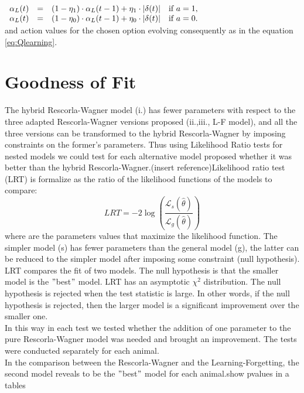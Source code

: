 \begin{description}
   $\begin{array}{lcll}
    \alpha_{L}(t) & = & (1-\eta_1)\cdot\alpha_{L}(t-1)+\eta_1\cdot\left\lvert\delta(t)\right\rvert & \mbox{if\,\,}  a=1,\\
    \alpha_{L}(t) & = & (1-\eta_0)\cdot\alpha_{L}(t-1)+\eta_0\cdot\left\lvert\delta(t)\right\rvert & \mbox{if\,\,}  a=0.\\
    \end{array}$\\
    and action values for the chosen option evolving consequently as in the equation \ref{eq:Qlearning}.
\end{description}
\section{Goodness of Fit}
\label{sec:Behavior}
The hybrid Rescorla-Wagner model (i.) has fewer parameters with respect to the three adapted Rescorla-Wagner versions proposed (ii.,iii., L-F model), and all the three versions can be transformed to the hybrid Rescorla-Wagner by imposing constraints on the former's parameters. Thus using Likelihood Ratio tests for nested models we could test for each alternative model proposed whether it was better than the hybrid Rescorla-Wagner.({\color{red}insert reference})Likelihood ratio test (LRT) is formalize as the ratio of the likelihood functions of the models to compare: 
\begin{equation}
LRT = -2 \log (\frac{\mathcal{L}_s(\hat{\theta})}{\mathcal{L}_g(\hat{\theta})})
\label{eq:LRT}
\end{equation}
where \hat{\theta} are the parameters values that maximize the likelihood function.
The simpler model (s) has fewer parameters than the general model (g), the latter can be reduced to the simpler model after imposing some constraint (null hypothesis).\\
LRT compares the fit of two models. The null hypothesis is that the smaller model is the $"$best$"$ model. LRT has an asymptotic $\chi^2$ distribution. The null hypothesis is rejected when the test statistic is large. In other words, if the null hypothesis is rejected, then the larger model is a significant improvement over the smaller one.\\
In this way in each test we tested whether the addition of one parameter to the pure Rescorla-Wagner model was needed and brought an improvement. The tests were conducted separately for each animal.\\In the comparison between the Rescorla-Wagner and the Learning-Forgetting, the second model reveals to be the $"$best$"$ model for each animal.{\color{red}show pvalues in a tables}
